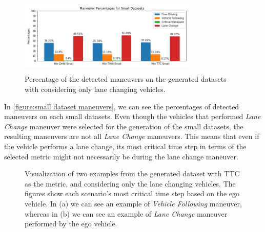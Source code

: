 \documentclass[conference]{IEEEtran}
\begin{document}
\begin{figure}[!h]
  \begin{center}
  	\includegraphics[width=8.5cm,height=3.7cm]{./images/small_datasets_maneuvers}
  \end{center}
  \caption{Percentage of the detected maneuvers on the generated datasets with considering only lane changing vehicles.}
  \label{figure:small dataset maneuvers}
\end{figure}

In \autoref{figure:small dataset maneuvers}, we can see the percentages of detected maneuvers on each small datasets. Even though the vehicles that performed \textit{Lane Change} maneuver were selected for the generation of the small datasets, the resulting maneuvers are not all \textit{Lane Change} maneuvers. This means that even if the vehicle performs a lane change, its most critical time step in terms of the selected metric might not necessarily be during the lane change maneuver.

\begin{figure}[!h]
\centering
{}
\vfill
{}
\caption{Visualization of two examples from the generated dataset with TTC as the metric, and considering only the lane changing vehicles. The figures show each scenario's most critical time step based on the ego vehicle. In (a) we can see an example of \textit{Vehicle Following} maneuver, whereas in (b) we can see an example of \textit{Lane Change} maneuver performed by the ego vehicle.}
\label{figure:generated scenario}
\end{figure}
\end{document}
